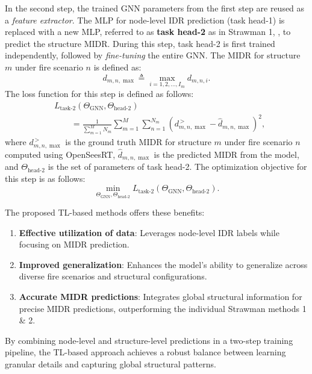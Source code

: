 In the second step, the trained GNN parameters from the first step are reused as a {\em{feature extractor}}. The MLP for node-level IDR prediction (task head-1) is replaced with a new MLP, referred to as {\bf{task head-2}} as in Strawman 1, , to predict the structure MIDR. During this step, task head-2 is first trained independently, followed by {\em{fine-tuning}} the entire GNN. The MIDR for structure $m$ under fire scenario $n$ is defined as:  
\begin{equation}
    d_{m,n,\max} \triangleq \max_{i=1,2,\dots,I_{m}} d_{m,n,i}.
\end{equation}  
The loss function for this step is defined as follows:
\begin{equation}
    \label{eq:mdr_loss_task2}
    \begin{aligned}
        & L_{\text{task-2}}\left(\Theta_{\text{GNN}}, \Theta_{\text{head-2}}\right)\\
        & \qquad=\frac{1}{\sum_{m=1}^{M} N_{m}}\sum_{m=1}^{M} \sum_{n=1}^{N_{m}} \left( d_{m,n,\max}^{\, \gt} - \widehat{d}_{m,n,\max} \right)^2,
    \end{aligned}
\end{equation}  
where $d_{m,n,\max}^{\, \gt}$ is the ground truth MIDR for structure $m$ under fire scenario $n$ computed using OpenSeesRT, $\widehat{d}_{m,n,\max}$ is the predicted MIDR from the model, and $\Theta_{\text{head-2}}$ is the set of parameters of task head-2. The optimization objective for this step is as follows:
\begin{equation}
    \label{eq:mdr_task2}
    \min_{\Theta_{\text{GNN}}, \Theta_{\text{head-2}}} L_{\text{task-2}}\left(\Theta_{\text{GNN}}, \Theta_{\text{head-2}}\right).
\end{equation}  

The proposed TL-based methods offers these benefits:
\begin{enumerate}
    \item {\bf{Effective utilization of data}}: Leverages node-level IDR labels while focusing on MIDR prediction.
    \item {\bf{Improved generalization}}: Enhances the model's ability to generalize across diverse fire scenarios and structural configurations.
    \item {\bf{Accurate MIDR predictions}}: Integrates global structural information for precise MIDR predictions, outperforming the individual Strawman methods 1 \& 2.
\end{enumerate}
By combining node-level and structure-level predictions in a two-step training pipeline, the TL-based approach achieves a robust balance between learning granular details and capturing global structural patterns. 
